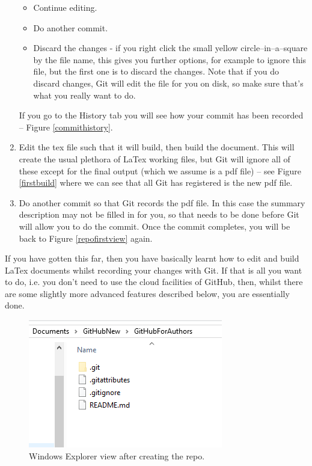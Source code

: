 \documentclass[a4paper, 12pt]{article}
\begin{document}
\begin{enumerate}
\begin{itemize}
\item Continue editing.
\item Do another commit.
\item Discard the changes - if you right click the small yellow circle--in--a--square by the file name, this gives you further options, for example to ignore this file, but the first one is to discard the changes. Note that if you do discard changes, Git will edit the file for you on disk, so make sure that's what you really want to do. 
\end{itemize}
If you go to the History tab you will see how your commit has been recorded -- Figure \ref{commithistory}.
\item Edit the tex file such that it will build, then build the document. This will create the usual plethora of LaTex working files, but Git will ignore all of these except for the final output (which we assume is a pdf file) -- see Figure \ref{firstbuild} where we can see that all Git has registered is the new pdf file.
\item Do another commit so that Git records the pdf file. In this case the summary description may not be filled in for you, so that needs to be done before Git will allow you to do the commit. Once the commit completes, you will be back to Figure \ref{repofirstview} again.
\end{enumerate}
If you have gotten this far, then you have basically learnt how to edit and build LaTex documents whilst recording your changes with Git. If that is all you want to do, i.e. you don't need to use the cloud facilities of GitHub, then, whilst there are some slightly more advanced features described below, you are essentially done.

\begin{figure}
\centering
\includegraphics{NewRepoFirstViewExplorer}
\caption{Windows Explorer view after creating the repo.}
\label{repofirstviewexplorer}
\end{figure}
\end{document}
